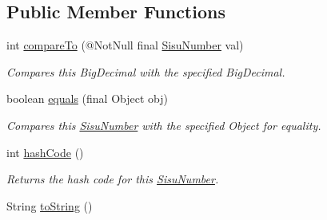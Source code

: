 \subsection*{Public Member Functions}
\begin{DoxyCompactItemize}
\item 
int \hyperlink{classcom_1_1aarrelaakso_1_1drawl_1_1_sisu_number_a554f83d5273ba11b53e1c82743a7ece0}{compare\+To} (@Not\+Null final \hyperlink{classcom_1_1aarrelaakso_1_1drawl_1_1_sisu_number}{Sisu\+Number} val)
\begin{DoxyCompactList}\small\item\em Compares this Big\+Decimal with the specified Big\+Decimal. \end{DoxyCompactList}\item 
boolean \hyperlink{classcom_1_1aarrelaakso_1_1drawl_1_1_sisu_number_afb509c2c09d10318b136e4defbedd47e}{equals} (final Object obj)
\begin{DoxyCompactList}\small\item\em Compares this \hyperlink{classcom_1_1aarrelaakso_1_1drawl_1_1_sisu_number}{Sisu\+Number} with the specified Object for equality. \end{DoxyCompactList}\item 
int \hyperlink{classcom_1_1aarrelaakso_1_1drawl_1_1_sisu_number_a84f5852d7f79f865cc51d710d09b7032}{hash\+Code} ()
\begin{DoxyCompactList}\small\item\em Returns the hash code for this \hyperlink{classcom_1_1aarrelaakso_1_1drawl_1_1_sisu_number}{Sisu\+Number}. \end{DoxyCompactList}\item 
String \hyperlink{classcom_1_1aarrelaakso_1_1drawl_1_1_sisu_number_a0ed133b435cf93b55afbecb6d28e6cd6}{to\+String} ()
\end{DoxyCompactItemize}
